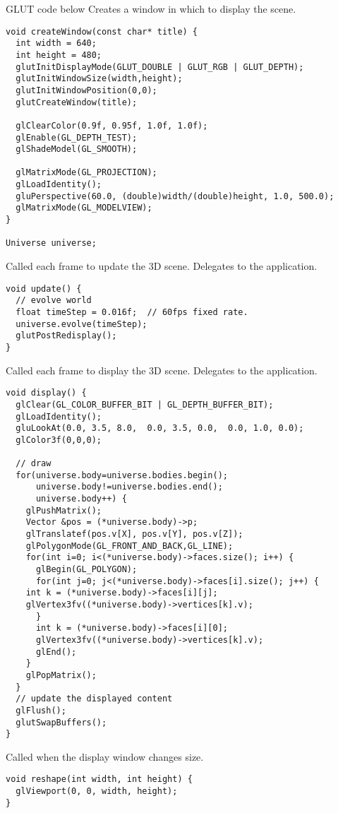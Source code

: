 GLUT code below
Creates a window in which to display the scene.
\begin{lstlisting}
void createWindow(const char* title) {
  int width = 640;
  int height = 480;
  glutInitDisplayMode(GLUT_DOUBLE | GLUT_RGB | GLUT_DEPTH);
  glutInitWindowSize(width,height);
  glutInitWindowPosition(0,0);
  glutCreateWindow(title);
  
  glClearColor(0.9f, 0.95f, 1.0f, 1.0f);
  glEnable(GL_DEPTH_TEST);
  glShadeModel(GL_SMOOTH);
  
  glMatrixMode(GL_PROJECTION);
  glLoadIdentity();
  gluPerspective(60.0, (double)width/(double)height, 1.0, 500.0);
  glMatrixMode(GL_MODELVIEW);
}

Universe universe;
\end{lstlisting}

Called each frame to update the 3D scene. Delegates to
the application.
\begin{lstlisting}
void update() {
  // evolve world
  float timeStep = 0.016f;	// 60fps fixed rate.
  universe.evolve(timeStep);
  glutPostRedisplay();
}
\end{lstlisting}

Called each frame to display the 3D scene. Delegates to
the application.
\begin{lstlisting}
void display() {
  glClear(GL_COLOR_BUFFER_BIT | GL_DEPTH_BUFFER_BIT);
  glLoadIdentity();
  gluLookAt(0.0, 3.5, 8.0,  0.0, 3.5, 0.0,  0.0, 1.0, 0.0);
  glColor3f(0,0,0);
  
  // draw
  for(universe.body=universe.bodies.begin();
      universe.body!=universe.bodies.end();
      universe.body++) {
    glPushMatrix();
    Vector &pos = (*universe.body)->p;
    glTranslatef(pos.v[X], pos.v[Y], pos.v[Z]);
    glPolygonMode(GL_FRONT_AND_BACK,GL_LINE);
    for(int i=0; i<(*universe.body)->faces.size(); i++) {      
      glBegin(GL_POLYGON);
      for(int j=0; j<(*universe.body)->faces[i].size(); j++) {
	int k = (*universe.body)->faces[i][j]; 
	glVertex3fv((*universe.body)->vertices[k].v);
      }
      int k = (*universe.body)->faces[i][0]; 
      glVertex3fv((*universe.body)->vertices[k].v);
      glEnd();
    }
    glPopMatrix();
  }
  // update the displayed content
  glFlush();
  glutSwapBuffers();
}
\end{lstlisting}

Called when the display window changes size.
\begin{lstlisting}
void reshape(int width, int height) {
  glViewport(0, 0, width, height);
}
\end{lstlisting}

